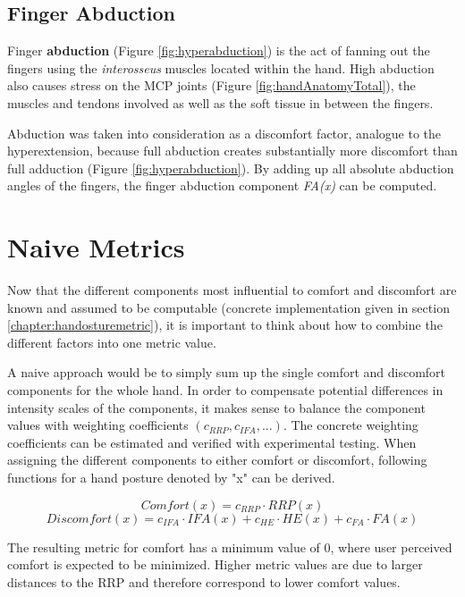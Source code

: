 \subsection{Finger Abduction}

Finger \textbf{abduction} (Figure \ref{fig:hyperabduction}) is the act of fanning out the fingers using the \textit{interosseus} muscles located within the hand. 
High abduction also causes stress on the MCP joints (Figure \ref{fig:handAnatomyTotal}), the muscles and tendons involved as well as the soft tissue in between the fingers.

Abduction was taken into consideration as a discomfort factor, analogue to the hyperextension, because full abduction creates substantially more discomfort than full adduction (Figure \ref{fig:hyperabduction}). By adding up all absolute abduction angles of the fingers, the finger abduction component \textit{FA(x)} can be computed.

\section{Naive Metrics}

Now that the different components most influential to comfort and discomfort are known and assumed to be computable (concrete implementation given in section \ref{chapter:handosturemetric}), it is important to think about how to combine the different factors into one metric value. 

A naive approach would be to simply sum up the single comfort and discomfort components for the whole hand. In order to compensate potential differences in intensity scales of the components, it makes sense to balance the component values with weighting coefficients \begin{math}(c_{RRP}, c_{IFA}, ...)\end{math}. The concrete weighting coefficients can be estimated and verified with experimental testing. When assigning the different components to either comfort or discomfort, following functions for a hand posture denoted by "x" can be derived.

	\[
	Comfort(x) = c_{RRP}\cdot RRP(x)
	\]
	\[
	Discomfort(x) = c_{IFA}\cdot IFA(x)  +  c_{HE}\cdot HE(x)  +  c_{FA}\cdot FA(x)
	\]
	\vspace{5pt}
	
	
The resulting metric for comfort has a minimum value of 0, where user perceived comfort is expected to be minimized. Higher metric values are due to larger distances to the RRP and therefore correspond to lower comfort values.

